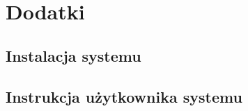 \newpage
\section*{Dodatki} \label{Dodatki}
\subsection*{Instalacja systemu \NazwaSys}
\subsection*{Instrukcja użytkownika systemu \NazwaSys}
 
